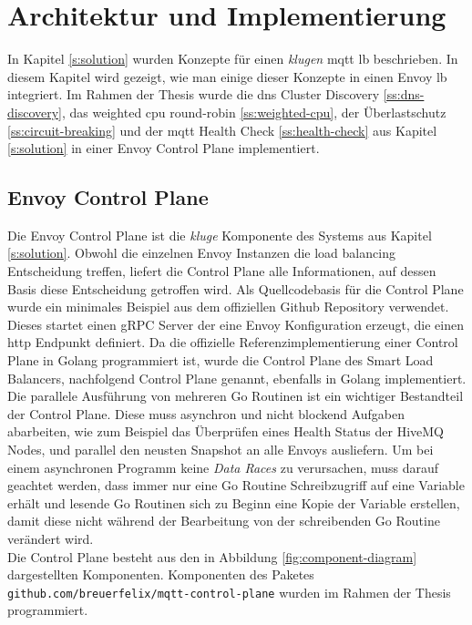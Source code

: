\section{Architektur und Implementierung} \label{s:implementation}
In Kapitel \ref{s:solution} wurden Konzepte für einen \textit{klugen} \ac{mqtt} \acl{lb} beschrieben. In diesem Kapitel wird gezeigt, wie man einige dieser Konzepte in einen Envoy \acl{lb} integriert.
Im Rahmen der Thesis wurde die \ac{dns} Cluster Discovery \ref{ss:dns-discovery}, das weighted \ac{cpu} round-robin \ref{ss:weighted-cpu}, der Überlastschutz \ref{ss:circuit-breaking} und der \ac{mqtt} Health Check \ref{ss:health-check} aus Kapitel \ref{s:solution} in einer Envoy Control Plane implementiert.

\subsection{Envoy Control Plane} \label{si:control-plane}
Die Envoy Control Plane ist die \textit{kluge} Komponente des Systems aus Kapitel \ref{s:solution}. Obwohl die einzelnen Envoy Instanzen die load balancing Entscheidung treffen, liefert die Control Plane alle Informationen, auf dessen Basis diese Entscheidung getroffen wird.
Als Quellcodebasis für die Control Plane wurde ein minimales Beispiel aus dem offiziellen Github Repository \cite{EnvoyproxyGocontrolplane} verwendet. Dieses startet einen gRPC Server der eine Envoy Konfiguration erzeugt, die einen \ac{http} Endpunkt definiert. Da die offizielle Referenzimplementierung einer Control Plane in Golang programmiert ist, wurde die Control Plane des Smart Load Balancers, nachfolgend Control Plane genannt, ebenfalls in Golang implementiert.
\\
Die parallele Ausführung von mehreren Go Routinen ist ein wichtiger Bestandteil der Control Plane. Diese muss asynchron und nicht blockend Aufgaben abarbeiten, wie zum Beispiel das Überprüfen eines Health Status der HiveMQ Nodes, und parallel den neusten Snapshot an alle Envoys ausliefern.
Um bei einem asynchronen Programm keine \textit{Data Races} zu verursachen, muss darauf geachtet werden, dass immer nur eine Go Routine Schreibzugriff auf eine Variable erhält und lesende Go Routinen sich zu Beginn eine Kopie der Variable erstellen, damit diese nicht während der Bearbeitung von der schreibenden Go Routine verändert wird.
\\
Die Control Plane besteht aus den in Abbildung \ref{fig:component-diagram} dargestellten Komponenten. Komponenten des Paketes \verb|github.com/breuerfelix/mqtt-control-plane| wurden im Rahmen der Thesis programmiert.
